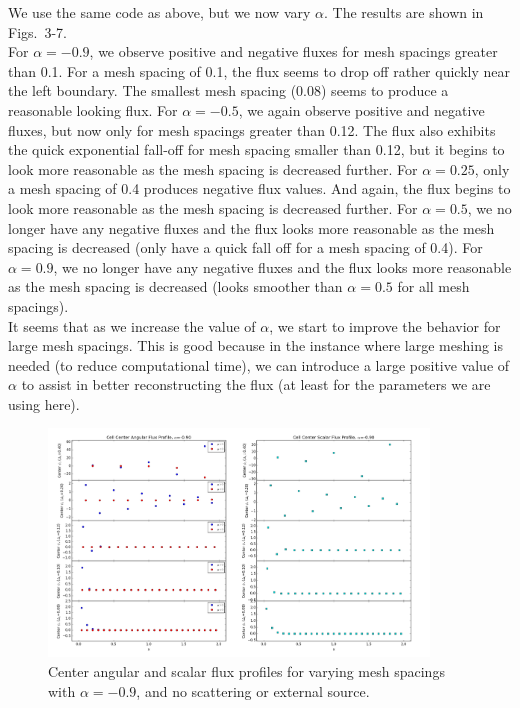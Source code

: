 \documentclass[10pt]{article}
\begin{document}
We use the same code as above, but we now vary $\alpha$. The results are shown in Figs.~3-7. \\

For $\alpha=-0.9$, we observe positive and negative fluxes for mesh spacings greater than 0.1. For a mesh spacing of 0.1, the flux seems to drop off rather quickly near the left boundary. The smallest mesh spacing (0.08) seems to produce a reasonable looking flux. For $\alpha=-0.5$, we again observe positive and negative fluxes, but now only for mesh spacings greater than 0.12. The flux also exhibits the quick exponential fall-off for mesh spacing smaller than 0.12, but it begins to look more reasonable as the mesh spacing is decreased further. For $\alpha=0.25$, only a mesh spacing of 0.4 produces negative flux values. And again, the flux begins to look more reasonable as the mesh spacing is decreased further. For $\alpha=0.5$, we no longer have any negative fluxes and the flux looks more reasonable as the mesh spacing is decreased (only have a quick fall off for a mesh spacing of 0.4). For $\alpha=0.9$, we no longer have any negative fluxes and the flux looks more reasonable as the mesh spacing is decreased (looks smoother than $\alpha=0.5$ for all mesh spacings).\\

It seems that as we increase the value of $\alpha$, we start to improve the behavior for large mesh spacings. This is good because in the instance where large meshing is needed (to reduce computational time), we can introduce a large positive value of $\alpha$ to assist in better reconstructing the flux (at least for the parameters we are using here).

\begin{figure}[H]
    \centering
    \includegraphics[width=0.9\textwidth]{Figures/FluxProfile_a=-09}
    \caption{Center angular and scalar flux profiles for varying mesh spacings with $\alpha = -0.9$, and no scattering or external source.}
    \label{fig3}
\end{figure}
\end{document}
